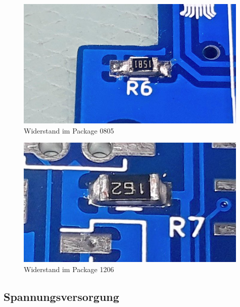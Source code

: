 \documentclass[12pt, a4paper]{article}		%
\begin{document}
\begin{minipage}[t]{0.49\textwidth}
\begin{figure}[H]
	\centering
		\includegraphics[width=0.99\textwidth]{Grafiken/IMG_-vz92y3.jpg}
	\caption{Widerstand im Package 0805}
	\label{fig:R0805}
\end{figure}
\end{minipage}
\begin{minipage}[t]{0.49\textwidth}
\begin{figure}[H]
	\centering
		\includegraphics[width=0.99\textwidth]{Grafiken/IMG_l2oi9e.jpg}
	\caption{Widerstand im Package 1206}
	\label{fig:R1206}
\end{figure}
\end{minipage}

\subsection{Spannungsversorgung}
\end{document}
